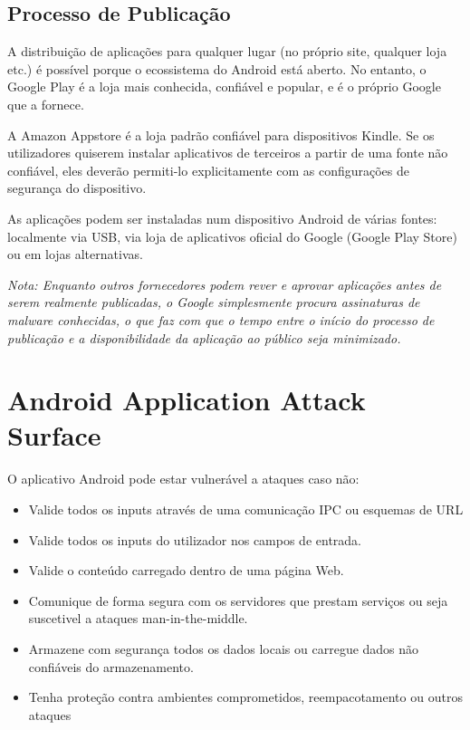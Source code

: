 \subsection{Processo de Publicação}
A distribuição de aplicações para qualquer lugar (no próprio site, qualquer loja etc.) é possível porque o ecossistema do Android está aberto. No entanto, o Google Play é a loja mais conhecida, confiável e popular, e é o próprio Google que a fornece. 

A Amazon Appstore é a loja padrão confiável para dispositivos Kindle. Se os utilizadores quiserem instalar aplicativos de terceiros a partir de uma fonte não confiável, eles deverão permiti-lo explicitamente com as configurações de segurança do dispositivo.

As aplicações podem ser instaladas num dispositivo Android de várias fontes: localmente via USB, via loja de aplicativos oficial do Google (Google Play Store) ou em lojas alternativas.
\\

\par \textit{Nota: Enquanto outros fornecedores podem rever e aprovar aplicações antes de serem realmente publicadas, o Google simplesmente procura assinaturas de malware conhecidas, o que faz com que o tempo entre o início do processo de publicação e a disponibilidade da aplicação ao público seja minimizado.}


\newpage
\section{Android Application Attack Surface}
O aplicativo Android pode estar vulnerável a ataques caso não:
\begin{itemize}
    \item Valide todos os inputs através de uma comunicação IPC ou esquemas de URL
    \item Valide todos os inputs do utilizador nos campos de entrada.
    \item Valide o conteúdo carregado dentro de uma página Web.
    \item Comunique de forma segura com os servidores que prestam serviços ou seja suscetivel a ataques man-in-the-middle.
    \item Armazene com segurança todos os dados locais ou carregue dados não confiáveis do armazenamento.
    \item Tenha proteção contra ambientes comprometidos, reempacotamento ou outros ataques
\end{itemize}



